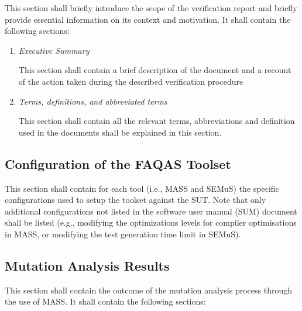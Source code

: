 This section shall briefly introduce the scope of the verification report and briefly provide essential information on its context and motivation.
It shall contain the following sections:
\begin{enumerate}
    \item \emph{Executive Summary}

    This section shall contain a brief description of the document and a recount of the action taken during the described verification procedure

    \item \emph{ Terms, definitions, and abbreviated terms}

    This section shall contain all the relevant terms, abbreviations and definition used in the documents shall be explained in this section.
\end{enumerate}


\subsection{Configuration of the FAQAS Toolset}

This section shall contain for each tool (i.e., MASS and SEMuS) the specific configurations used to setup the toolset against the SUT. Note that only additional configurations not listed in the software user manual (SUM) document shall be listed (e.g., modifying the optimizations levels for compiler optimisations in MASS, or modifying the test generation time limit in SEMuS).

\subsection{Mutation Analysis Results}

This section shall contain the outcome of the mutation analysis process through the use of MASS. It shall contain the following sections:

